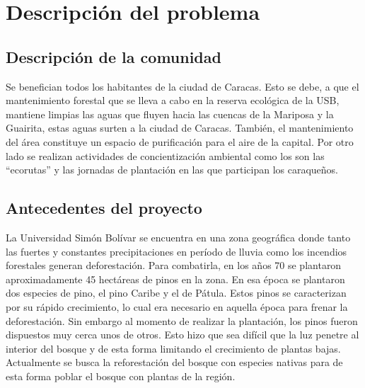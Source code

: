 \chapter*{Descripción del problema}

\section*{Descripción de la comunidad}

Se benefician todos los habitantes de la ciudad de Caracas. Esto se debe, a que el mantenimiento forestal que se lleva a cabo en la reserva ecológica de la USB, mantiene limpias las aguas que fluyen hacia las cuencas de la Mariposa y la Guairita, estas aguas surten a la ciudad de Caracas. También, el mantenimiento del área constituye un espacio de purificación para el aire de la capital. Por otro lado se realizan actividades de concientización ambiental como los son las ``ecorutas'' y las jornadas de plantación en las que participan los caraqueños.

\section*{Antecedentes del proyecto}

La Universidad Simón Bolívar se encuentra en una zona geográfica donde tanto las fuertes y constantes precipitaciones en período de lluvia como los incendios forestales generan deforestación. Para combatirla, en los años 70 se plantaron aproximadamente 45 hectáreas de pinos en la zona. En esa época se plantaron dos especies de pino, el pino Caribe y el de Pátula. Estos pinos se caracterizan por su rápido crecimiento, lo cual era necesario en aquella época para frenar la deforestación. Sin embargo al momento de realizar la plantación, los pinos fueron dispuestos muy cerca unos de otros. Esto hizo que sea difícil que la luz penetre al interior del bosque y de esta forma limitando el crecimiento de plantas bajas. Actualmente se busca la reforestación del bosque con especies nativas para de esta forma poblar el bosque con plantas de la región.